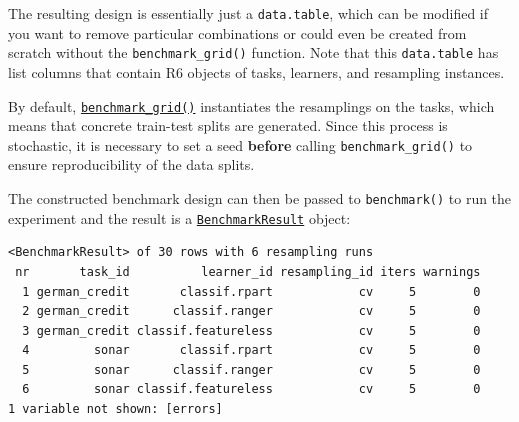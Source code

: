 The resulting design is essentially just a \texttt{data.table}, which
can be modified if you want to remove particular combinations or could
even be created from scratch without the \texttt{benchmark\_grid()}
function. Note that this \texttt{data.table} has list columns that
contain R6 objects of tasks, learners, and resampling instances.

\begin{tcolorbox}[enhanced jigsaw, opacitybacktitle=0.6, rightrule=.15mm, opacityback=0, arc=.35mm, breakable, titlerule=0mm, colframe=quarto-callout-warning-color-frame, coltitle=black, bottomrule=.15mm, toprule=.15mm, colback=white, colbacktitle=quarto-callout-warning-color!10!white, bottomtitle=1mm, toptitle=1mm, title=\textcolor{quarto-callout-warning-color}{\faExclamationTriangle}\hspace{0.5em}{Reproducibility When Using \texttt{benchmark\_grid()}}, leftrule=.75mm, left=2mm]

By default,
\href{https://mlr3.mlr-org.com/reference/benchmark_grid.html}{\texttt{benchmark\_grid()}}
instantiates the resamplings on the tasks, which means that concrete
train-test splits are generated. Since this process is stochastic, it is
necessary to set a seed \textbf{before} calling
\texttt{benchmark\_grid()} to ensure reproducibility of the data splits.

\end{tcolorbox}

The constructed benchmark design can then be passed to
\texttt{benchmark()} to run the experiment and the result is a
\href{https://mlr3.mlr-org.com/reference/BenchmarkResult.html}{\texttt{BenchmarkResult}}
object:

\begin{Shaded}
\begin{Highlighting}[]
\OtherTok{=} 
\end{Highlighting}
\end{Shaded}

\begin{verbatim}
<BenchmarkResult> of 30 rows with 6 resampling runs
 nr       task_id          learner_id resampling_id iters warnings
  1 german_credit       classif.rpart            cv     5        0
  2 german_credit      classif.ranger            cv     5        0
  3 german_credit classif.featureless            cv     5        0
  4         sonar       classif.rpart            cv     5        0
  5         sonar      classif.ranger            cv     5        0
  6         sonar classif.featureless            cv     5        0
1 variable not shown: [errors]
\end{verbatim}

